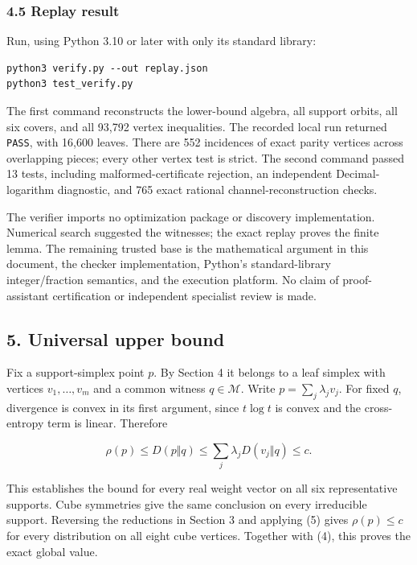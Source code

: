 \subsubsection{4.5 Replay result}\label{replay-result}

Run, using Python 3.10 or later with only its standard library:

\begin{verbatim}
python3 verify.py --out replay.json
python3 test_verify.py
\end{verbatim}

The first command reconstructs the lower-bound algebra, all support
orbits, all six covers, and all 93,792 vertex inequalities. The recorded
local run returned \texttt{PASS}, with 16,600 leaves. There are 552
incidences of exact parity vertices across overlapping pieces; every
other vertex test is strict. The second command passed 13 tests,
including malformed-certificate rejection, an independent
Decimal-logarithm diagnostic, and 765 exact rational
channel-reconstruction checks.

The verifier imports no optimization package or discovery
implementation. Numerical search suggested the witnesses; the exact
replay proves the finite lemma. The remaining trusted base is the
mathematical argument in this document, the checker implementation,
Python's standard-library integer/fraction semantics, and the execution
platform. No claim of proof-assistant certification or independent
specialist review is made.

\subsection{5. Universal upper bound}\label{universal-upper-bound}

Fix a support-simplex point \(p\). By Section 4 it belongs to a leaf
simplex with vertices \(v_1,\ldots,v_m\) and a common witness
\(q\in\mathcal M\). Write \(p=\sum_j\lambda_jv_j\). For fixed \(q\),
divergence is convex in its first argument, since \(t\log t\) is convex
and the cross-entropy term is linear. Therefore

\[
\rho(p)\le D(p\Vert q)
\le\sum_j\lambda_jD(v_j\Vert q)\le c.
\tag{12}
\]

This establishes the bound for every real weight vector on all six
representative supports. Cube symmetries give the same conclusion on
every irreducible support. Reversing the reductions in Section 3 and
applying (5) gives \(\rho(p)\le c\) for every distribution on all eight
cube vertices. Together with (4), this proves the exact global value.


